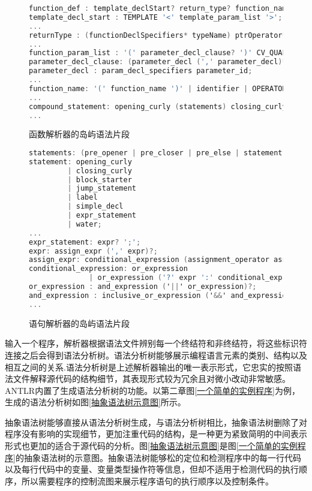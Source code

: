 \begin{figure}[h]
\begin{lstlisting}[language=C]
function_def : template_declStart? return_type? function_name function_paramList ctorList? compound_statement;
template_decl_start : TEMPLATE '<' template_param_list '>';
...
returnType : (functionDeclSpecifiers* typeName) ptrOperator*;
...
function_param_list : '(' parameter_decl_clause? ')' CV_QUALIFIER* exception_specification?;
parameter_decl_clause: (parameter_decl (',' parameter_decl)*) (',' '...')? | VOID;
parameter_decl : param_decl_specifiers parameter_id;
...
function_name: '(' function_name ')' | identifier | OPERATOR operator;
...
compound_statement: opening_curly (statements) closing_curly;
...
\end{lstlisting}
\caption{函数解析器的岛屿语法片段}
\label{函数解析器的岛屿语法片段}
\end{figure}

\begin{figure}[h]
\begin{lstlisting}[language=C]
statements: (pre_opener | pre_closer | pre_else | statement)*;
statement: opening_curly
         | closing_curly
         | block_starter
         | jump_statement
         | label 
         | simple_decl
         | expr_statement
         | water;
...
expr_statement: expr? ';';
expr: assign_expr (',' expr)?;
assign_expr: conditional_expression (assignment_operator assign_expr)?;
conditional_expression: or_expression
		      | or_expression ('?' expr ':' conditional_expression)
or_expression : and_expression ('||' or_expression)?;
and_expression : inclusive_or_expression ('&&' and_expression)?;
...
\end{lstlisting}
\caption{语句解析器的岛屿语法片段}
\label{语句解析器的岛屿语法片段}
\end{figure}

输入一个程序，解析器根据语法文件辨别每一个终结符和非终结符，将这些标识符连接之后会得到语法分析树。语法分析树能够展示编程语言元素的类别、结构以及相互之间的关系.语法分析树是上述解析器输出的唯一表示形式，它忠实的按照语法文件解释源代码的结构细节，其表现形式较为冗余且对微小改动非常敏感。ANTLR内置了生成语法分析树的功能。以第二章图\ref{一个简单的实例程序}为例，生成的语法分析树如图\ref{抽象语法树示意图}所示。

抽象语法树能够直接从语法分析树生成，与语法分析树相比，抽象语法树删除了对程序没有影响的实现细节，更加注重代码的结构，是一种更为紧致简明的中间表示形式也更加的适合于源代码的分析。图\ref{抽象语法树示意图}是图\ref{一个简单的实例程序}的抽象语法树的示意图。抽象语法树能够松的定位和检测程序中的每一行代码以及每行代码中的变量、变量类型操作符等信息，但却不适用于检测代码的执行顺序，所以需要程序的控制流图来展示程序语句的执行顺序以及控制条件。

